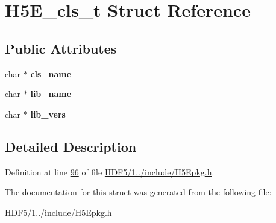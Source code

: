 \hypertarget{struct_h5_e__cls__t}{}\section{H5\+E\+\_\+cls\+\_\+t Struct Reference}
\label{struct_h5_e__cls__t}
\subsection*{Public Attributes}
\begin{DoxyCompactItemize}
\item 
\mbox{\label{struct_h5_e__cls__t_af4bb7012fd54ff461820f141ba4d0dd3}} 
char $\ast$ {\bfseries cls\+\_\+name}
\item 
\mbox{\label{struct_h5_e__cls__t_a95428c41e7b1fe8ab6efa3e6fcd90c2f}} 
char $\ast$ {\bfseries lib\+\_\+name}
\item 
\mbox{\label{struct_h5_e__cls__t_ab5298d5bbafd7eefc812f540e273a5c4}} 
char $\ast$ {\bfseries lib\+\_\+vers}
\end{DoxyCompactItemize}


\subsection{Detailed Description}


Definition at line \hyperlink{_h_d_f5_21_810_81_2include_2_h5_epkg_8h_source_l00096}{96} of file \hyperlink{_h_d_f5_21_810_81_2include_2_h5_epkg_8h_source}{H\+D\+F5/1../include/\+H5\+Epkg.\+h}.



The documentation for this struct was generated from the following file\+:\begin{DoxyCompactItemize}
\item 
H\+D\+F5/1../include/\+H5\+Epkg.\+h\end{DoxyCompactItemize}
